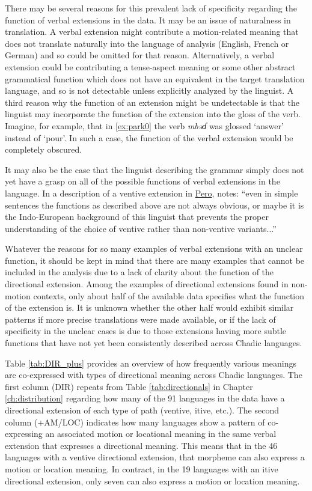 There may be several reasons for this prevalent lack of specificity regarding the function of verbal extensions in the data. It may be an issue of naturalness in translation. A verbal extension might contribute a motion-related meaning that does not translate naturally into the language of analysis (English, French or German) and so could be omitted for that reason. Alternatively, a verbal extension could be contributing a tense-aspect meaning or some other abstract grammatical function which does not have an equivalent in the target translation language, and so is not detectable unless explicitly analyzed by the linguist. A third reason why the function of an extension might be undetectable is that the linguist may incorporate the function of the extension into the gloss of the verb. Imagine, for example, that in \ref{ex:park0} the verb \textit{mbəɗ} was glossed `answer' instead of `pour'. In such a case, the function of the verbal extension would be completely obscured. 

It may also be the case that the linguist describing the grammar simply does not yet have a grasp on all of the possible functions of verbal extensions in the language. In a description of a ventive extension in \hyperref[pero]{Pero}, \citet[97]{frajzyngierGrammarPero1989} notes: ``even in simple sentences the functions as described above are not always obvious, or maybe it is the Indo-European background of this linguist that prevents the proper understanding of the choice of ventive rather than non-ventive variants...''

Whatever the reasons for so many examples of verbal extensions with an unclear function, it should be kept in mind that there are many examples that cannot be included in the analysis due to a lack of clarity about the function of the directional extension. Among the examples of directional extensions found in non-motion contexts, only about half of the available data specifies what the function of the extension is. It is unknown whether the other half would exhibit similar patterns if more precise translations were made available, or if the lack of specificity in the unclear cases is due to those extensions having more subtle functions that have not yet been consistently described across Chadic languages. 

Table \ref{tab:DIR_plus} provides an overview of how frequently various meanings are co-expressed with types of directional meaning across Chadic languages. The first column (DIR) repeats from Table \ref{tab:directionals} in  Chapter \ref{ch:distribution} regarding how many of the 91 languages in the data have a directional extension of each type of path (ventive, itive, etc.). The second column (+AM/LOC) indicates how many languages show a pattern of co-expressing an associated motion or locational meaning in the same verbal extension that expresses a directional meaning. This means that in the 46 languages with a ventive directional extension, that morpheme can also express a motion or location meaning. In contract, in the 19 languages with an itive directional extension, only seven can also express a motion or location meaning. 

